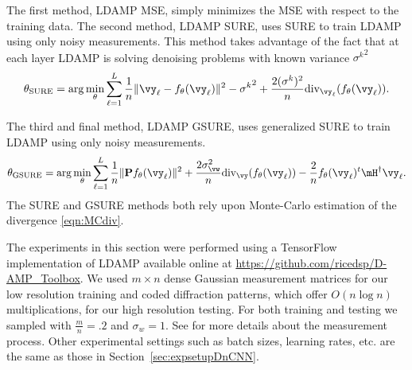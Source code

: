 \documentclass{article}
\begin{document}
The first method, LDAMP MSE, simply minimizes the MSE with respect to the training data.
The second method, LDAMP SURE, uses SURE to train LDAMP using only noisy measurements. 
This method takes advantage of the fact that at each layer LDAMP is solving denoising problems with known variance ${{\sigma}^k}^2$\[
\theta_{\text{SURE}}=\arg\min_\theta \sum_{\ell=1}^L  \frac{1}{n}\|\vy_\ell-f_\theta (\vy_\ell)\|^2-{{\sigma}^k}^2+\frac{2{({\sigma}^k})^2}{n}\text{div}_{\vy_\ell}(f_\theta (\vy_\ell)).
\]

The third and final method, LDAMP GSURE, uses generalized SURE to train LDAMP using only noisy measurements.  
\[
\theta_{\text{GSURE}}=\arg\min_\theta \sum_{\ell=1}^L  \frac{1}{n}\|\mathbf{P}f_\theta(\vy_\ell)\|^2+\frac{2\sigma_\vw^2}{n}\text{div}_\vy(f_\theta (\vy_\ell))
-\frac{2}{n}f_\theta (\vy_\ell)^t\mH^\dagger \vy_\ell.
\]%
The SURE and GSURE methods both rely upon Monte-Carlo estimation of the divergence \eqref{eqn:MCdiv}.

The experiments in this section were performed using a TensorFlow implementation of LDAMP available online at \url{https://github.com/ricedsp/D-AMP_Toolbox}. We used $m\times n$ dense Gaussian measurement matrices for our low resolution training and coded diffraction patterns, which offer $O(n\log n)$ multiplications, for our high resolution testing. For both training and testing we sampled with $\frac{m}{n}=.2$ and $\sigma_w=1$. See \cite{LDAMP} for more details about the measurement process. Other experimental settings such as batch sizes, learning rates, etc. are the same as those in Section~\ref{sec:expsetupDnCNN}.
\end{document}
